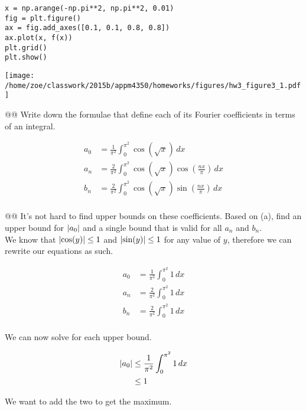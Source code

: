 \documentclass[10pt]{article}
\begin{document}
\begin{easylist}[enumerate]
\weave

\begin{verbatim}
x = np.arange(-np.pi**2, np.pi**2, 0.01)
fig = plt.figure()
ax = fig.add_axes([0.1, 0.1, 0.8, 0.8])
ax.plot(x, f(x))
plt.grid()
plt.show()
\end{verbatim}
\texttt{[image: /home/zoe/classwork/2015b/appm4350/homeworks/figures/hw3\_figure3\_1.pdf]}

\noweave

    @@ Write down the formulae that define each of its Fourier coefficients in terms of an integral.

    \begin{align*}
        a_0 &= \frac{1}{\pi^2} \int_0^{\pi^2} \cos(\sqrt{x}) \, dx\\
        a_n &= \frac{2}{\pi^2} \int_0^{\pi^2} \cos(\sqrt{x}) \cos\left(\frac{nx}{\pi}\right) \, dx\\
        b_n &= \frac{2}{\pi^2} \int_0^{\pi^2} \cos(\sqrt{x}) \sin\left(\frac{nx}{\pi}\right) \, dx\\
    \end{align*}

    @@ It's not hard to find upper bounds on these coefficients. Based on (a), find an upper bound for $\left\lvert a_0 \right\rvert$ and a
    single bound that is valid for all $a_n$ and $b_n$.\\

    We know that $\left\lvert \cos(y) \right\rvert \le 1$ and $\left\lvert \sin(y) \right\rvert \le 1$ for any value of $y$, therefore we can rewrite our
    equations as such.

    \begin{align*}
        a_0 &= \frac{1}{\pi^2} \int_0^{\pi^2} 1 \, dx\\
        a_n &= \frac{2}{\pi^2} \int_0^{\pi^2} 1 \, dx\\
        b_n &= \frac{2}{\pi^2} \int_0^{\pi^2} 1 \, dx\\
    \end{align*}

    We can now solve for each upper bound.

    \begin{align*}
        \left\lvert a_0 \right\rvert &\le \frac{1}{\pi^2} \int_0^{\pi^2} 1 \, dx\\
                    &\le 1\\
    \end{align*}

    We want to add the two to get the maximum.


\end{easylist}
\end{document}
